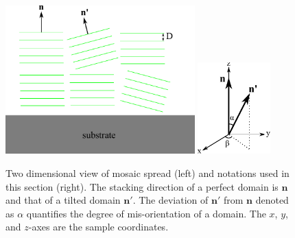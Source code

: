 \begin{figure}
  \centering
  \includegraphics[width=0.65\textwidth]{figures/ripple/mosaic/stack}
  \quad
  \includegraphics[width=0.25\textwidth]{figures/ripple/mosaic/spherical_coordinates}
  \caption{Two dimensional view of mosaic spread (left) and 
  notations used in this section (right). 
  The stacking direction of a perfect
  domain is $\mathbf{n}$ and that of a tilted domain $\mathbf{n'}$. 
  The deviation of $\mathbf{n'}$ from $\mathbf{n}$ denoted as $\alpha$
  quantifies the degree of mis-orientation of a domain. 
  The $x$, $y$, and $z$-axes are the sample coordinates.}
  \label{fig:spherical_coordinates}
\end{figure}

